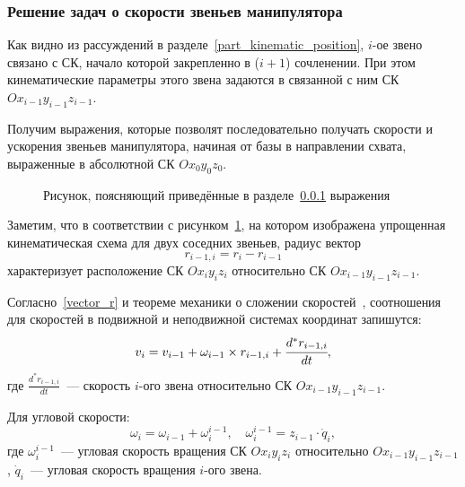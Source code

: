\vspace{0.5cm}
\subsubsection{Решение задач о скорости звеньев манипулятора}\label{part_kinematic_velocity}


Как видно из рассуждений в разделе~\ref{part_kinematic_position}, $i$-ое звено связано с СК, начало которой закрепленно в ($i+1$) сочленении. При этом кинематические параметры этого звена задаются в связанной с ним СК $Ox_{i-1}y_{i-1}z_{i-1}$.

Получим выражения, которые позволят последовательно получать скорости и ускорения звеньев манипулятора, начиная от базы в направлении схвата, выраженные в абсолютной СК $Ox_{0}y_{0}z_{0}$.

\begin{figure}[h!]
	\caption{Рисунок, поясняющий приведённые в разделе~\ref{part_kinematic_velocity} выражения}
	\label{img:bodies}
\end{figure}

Заметим, что в соответствии с рисунком~\ref{img:bodies}, на котором изображена упрощенная кинематическая схема для двух соседних звеньев, радиус вектор
\begin{equation}\label{vector_r}
	r_{i-1, i} = r_i - r_{i-1}
\end{equation}
характеризует расположение СК $Ox_{i}y_{i}z_{i}$ относительно СК $Ox_{i-1}y_{i-1}z_{i-1}$.

Согласно~\eqref{vector_r} и теореме механики о сложении скоростей~\cite{yabl19964}, соотношения для  скоростей в подвижной и неподвижной системах координат запишутся:
\begin{equation}
	v_i = v_{i-1} + \omega_{i-1} \times r_{i-1,i} + \cfrac{d^* r_{i-1,i}}{dt},
\end{equation}
где $\frac{d^* r_{i-1,i}}{dt}$~--- скорость $i$-ого звена относительно СК $Ox_{i-1}y_{i-1}z_{i-1}$.

Для угловой скорости:
\begin{equation}\label{omega_i}
	\omega_i = \omega_{i-1} + \omega^{i-1}_{i},
	\quad
	\omega^{i-1}_{i} = z_{i-1} \cdot \dot{q}_i,
\end{equation}
где $\omega^{i-1}_{i}$~--- угловая скорость вращения СК $Ox_{i}y_{i}z_{i}$ относительно $Ox_{i-1}y_{i-1}z_{i-1}$, $\dot{q}_i$~--- угловая скорость вращения $i$-ого звена.

